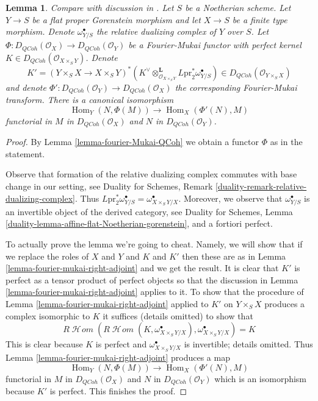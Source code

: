 \documentclass{stacks-project}
\newenvironment{reference}{\comment}{\endcomment}
\theoremstyle{plain}
\newtheorem{lemma}[subsection]{Lemma}
\theoremstyle{definition}
\theoremstyle{remark}
\numberwithin{equation}{subsection}
\def\Hom{\mathop{\mathrm{Hom}}\nolimits}
\def\SheafHom{\mathop{\mathcal{H}\!\mathit{om}}\nolimits}
\def\QCoh{\mathit{QCoh}}
\begin{document}
\begin{lemma}
\label{lemma-fourier-mukai-left-adjoint}
\begin{reference}
Compare with discussion in \cite{Rizzardo}.
\end{reference}
Let $S$ be a Noetherian scheme. Let $Y \to S$ be a flat proper
Gorenstein morphism and let $X \to S$ be a finite type morphism.
Denote $\omega^\bullet_{Y/S}$ the relative dualizing complex of
$Y$ over $S$. Let $\Phi : D_\QCoh(\mathcal{O}_X) \to D_\QCoh(\mathcal{O}_Y)$
be a Fourier-Mukai functor with perfect kernel
$K \in D_\QCoh(\mathcal{O}_{X \times_S Y})$. Denote
$$
K' = (Y \times_S X \to X \times_S Y)^*(K^\vee
\otimes_{\mathcal{O}_{X \times_S Y}}^\mathbf{L}
L\text{pr}_2^*\omega^\bullet_{Y/S})
\in
D_\QCoh(\mathcal{O}_{Y \times_S X})
$$
and denote $\Phi' : D_\QCoh(\mathcal{O}_Y) \to D_\QCoh(\mathcal{O}_X)$
the corresponding Fourier-Mukai transform. There is a canonical
isomorphism
$$
\Hom_Y(N, \Phi(M)) \longrightarrow \Hom_X(\Phi'(N), M)
$$
functorial in $M$ in $D_\QCoh(\mathcal{O}_X)$ and $N$ in
$D_\QCoh(\mathcal{O}_Y)$.
\end{lemma}

\begin{proof}
By Lemma \ref{lemma-fourier-Mukai-QCoh} we obtain a functor $\Phi$
as in the statement.

\medskip\noindent
Observe that formation of the relative dualizing complex commutes
with base change in our setting, see Duality for Schemes,
Remark \ref{duality-remark-relative-dualizing-complex}.
Thus $L\text{pr}_2^*\omega^\bullet_{Y/S} = \omega^\bullet_{X \times_S Y/X}$.
Moreover, we observe that $\omega^\bullet_{Y/S}$ is an
invertible object of the derived category, see Duality for Schemes, Lemma
\ref{duality-lemma-affine-flat-Noetherian-gorenstein}, and a fortiori
perfect.

\medskip\noindent
To actually prove the lemma we're going to cheat. Namely, we will
show that if we replace the roles of $X$ and $Y$ and $K$ and $K'$
then these are as in Lemma \ref{lemma-fourier-mukai-right-adjoint}
and we get the result. It is clear that $K'$ is perfect as a
tensor product of perfect objects so that the discussion in
Lemma \ref{lemma-fourier-mukai-right-adjoint} applies to it.
To show that the procedure of
Lemma \ref{lemma-fourier-mukai-right-adjoint} applied to $K'$
on $Y \times_S X$ produces a complex isomorphic to $K$ it suffices
(details omitted) to show that
$$
R\SheafHom(R\SheafHom(K, \omega^\bullet_{X \times_S Y/X}),
\omega^\bullet_{X \times_S Y/X}) = K
$$
This is clear because $K$ is perfect and $\omega^\bullet_{X \times_S Y/X}$
is invertible; details omitted. Thus
Lemma \ref{lemma-fourier-mukai-right-adjoint} produces a map
$$
\Hom_Y(N, \Phi(M)) \longrightarrow \Hom_X(\Phi'(N), M)
$$
functorial in $M$ in $D_\QCoh(\mathcal{O}_X)$ and $N$ in
$D_\QCoh(\mathcal{O}_Y)$ which is an isomorphism because
$K'$ is perfect. This finishes the proof.
\end{proof}
\end{document}
